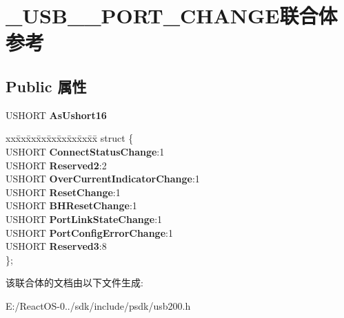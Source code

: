 \hypertarget{union___u_s_b__30___p_o_r_t___c_h_a_n_g_e}{}\section{\+\_\+\+U\+S\+B\+\_\+\_\+\+P\+O\+R\+T\+\_\+\+C\+H\+A\+N\+G\+E联合体 参考}
\label{union___u_s_b__30___p_o_r_t___c_h_a_n_g_e}
\subsection*{Public 属性}
\begin{DoxyCompactItemize}
\item 
\mbox{\label{union___u_s_b__30___p_o_r_t___c_h_a_n_g_e_a86cc3c3b822f50e49d4a9ca0a2717a90}} 
U\+S\+H\+O\+RT {\bfseries As\+Ushort16}
\item 
\mbox{\label{union___u_s_b__30___p_o_r_t___c_h_a_n_g_e_ab2b0aaa0a7f511024f19dfb8016d001d}} 
\begin{tabbing}
xx\=xx\=xx\=xx\=xx\=xx\=xx\=xx\=xx\=\kill
struct \{\\
\>USHORT {\bfseries ConnectStatusChange}:1\\
\>USHORT {\bfseries Reserved2}:2\\
\>USHORT {\bfseries OverCurrentIndicatorChange}:1\\
\>USHORT {\bfseries ResetChange}:1\\
\>USHORT {\bfseries BHResetChange}:1\\
\>USHORT {\bfseries PortLinkStateChange}:1\\
\>USHORT {\bfseries PortConfigErrorChange}:1\\
\>USHORT {\bfseries Reserved3}:8\\
\}; \\

\end{tabbing}\end{DoxyCompactItemize}


该联合体的文档由以下文件生成\+:\begin{DoxyCompactItemize}
\item 
E\+:/\+React\+O\+S-\/0../sdk/include/psdk/usb200.\+h\end{DoxyCompactItemize}
